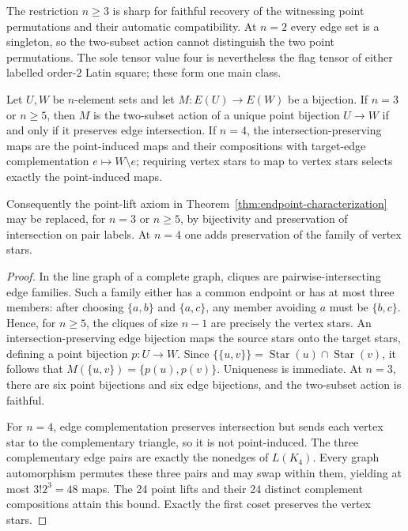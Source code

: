 The restriction $n\geq3$ is sharp for faithful recovery of the witnessing
point permutations and their automatic compatibility.  At $n=2$ every edge
set is a singleton, so the two-subset action cannot distinguish the two point
permutations.  The sole tensor value four is nevertheless the flag tensor of
either labelled order-$2$ Latin square; these form one main class.

\begin{proposition}
\label{prop:intrinsic-edge-lift}
Let $U,W$ be $n$-element sets and let $M:E(U)\to E(W)$ be a bijection.  If
$n=3$ or $n\geq5$, then $M$ is the two-subset action of a unique point
bijection $U\to W$ if and only if it preserves edge intersection.  If $n=4$,
the intersection-preserving maps are the point-induced maps and their
compositions with target-edge complementation $e\mapsto W\setminus e$;
requiring vertex stars to map to vertex stars selects exactly the
point-induced maps.

Consequently the point-lift axiom in
Theorem~\ref{thm:endpoint-characterization} may be replaced, for $n=3$ or
$n\geq5$, by bijectivity and preservation of intersection on pair labels.
At $n=4$ one adds preservation of the family of vertex stars.
\end{proposition}

\begin{proof}
In the line graph of a complete graph, cliques are pairwise-intersecting edge
families.
Such a family either has a common endpoint or has at most three members:
after choosing $\{a,b\}$ and $\{a,c\}$, any member avoiding $a$ must be
$\{b,c\}$.  Hence, for $n\geq5$, the cliques of size $n-1$ are precisely the
vertex stars.  An intersection-preserving edge bijection maps the source
stars onto the target stars, defining a point bijection $p:U\to W$.  Since
$\{\{u,v\}\}=\operatorname{Star}(u)\cap\operatorname{Star}(v)$, it follows
that $M(\{u,v\})=\{p(u),p(v)\}$.  Uniqueness is immediate.  At $n=3$, there
are six point bijections and six edge bijections, and the two-subset action is
faithful.

For $n=4$, edge complementation preserves intersection but sends each vertex
star to the complementary triangle, so it is not point-induced.  The three
complementary edge pairs are exactly the nonedges of $L(K_4)$.  Every graph
automorphism permutes these three pairs and may swap within them, yielding at
most $3!2^3=48$ maps.  The 24 point lifts and their 24 distinct complement
compositions attain this bound.  Exactly the first coset preserves the
vertex stars.
\end{proof}

